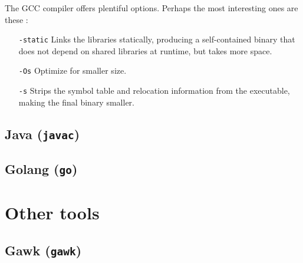 

The GCC compiler offers plentiful options. Perhaps the most interesting ones are these \cite{gcc-man}:

\setlength{\leftmargini}{5em}
\begin{itemize}
\item[\texttt{-static}] Links the libraries statically, producing a self-contained binary that does not depend on shared libraries at runtime, but takes more space.
\item[\texttt{-Os}] Optimize for smaller size.
\item[\texttt{-s}] Strips the symbol table and relocation information from the executable, making the final binary smaller.
\end{itemize}
\setlength{\leftmargini}{2.5em}


\subsection{Java (\texttt{javac})}
\label{java}





\subsection{Golang (\texttt{go})}





\section{Other tools}

\subsection{Gawk (\texttt{gawk})}


